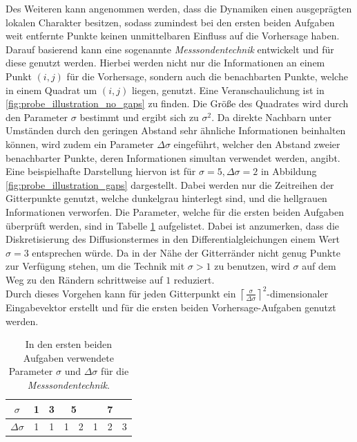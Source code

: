 Des Weiteren kann angenommen werden, dass die Dynamiken einen ausgeprägten lokalen Charakter besitzen, sodass zumindest bei den ersten beiden Aufgaben weit entfernte Punkte keinen unmittelbaren Einfluss auf die Vorhersage haben. Darauf basierend kann eine sogenannte \textit{Messsondentechnik} entwickelt und für diese genutzt werden. Hierbei werden nicht nur die Informationen an einem Punkt $(i, j)$ für die Vorhersage, sondern auch die benachbarten Punkte, welche in einem Quadrat um $(i, j)$ liegen, genutzt. Eine Veranschaulichung ist in \ref{fig:probe_illustration_no_gaps} zu finden. Die Größe des Quadrates wird durch den Parameter $\sigma$ bestimmt und ergibt sich zu $\sigma^2$. Da direkte Nachbarn unter Umständen durch den geringen Abstand sehr ähnliche Informationen beinhalten können, wird zudem ein Parameter $\Delta \sigma$ eingeführt, welcher den Abstand zweier benachbarter Punkte, deren Informationen simultan verwendet werden, angibt. Eine beispielhafte Darstellung hiervon ist für $\sigma = 5, \Delta \sigma=2$ in Abbildung \ref{fig:probe_illustration_gaps} dargestellt. Dabei werden nur die Zeitreihen der Gitterpunkte genutzt, welche dunkelgrau hinterlegt sind, und die hellgrauen Informationen verworfen. Die Parameter, welche für die ersten beiden Aufgaben überprüft werden, sind in Tabelle \ref{tab:probe_sigma_values} aufgelistet. Dabei ist anzumerken, dass die Diskretisierung des Diffusionstermes in den Differentialgleichungen einem Wert $\sigma=3$ entsprechen würde. Da in der Nähe der Gitterränder nicht genug Punkte zur Verfügung stehen, um die Technik mit $\sigma>1$ zu benutzen, wird $\sigma$ auf dem Weg zu den Rändern schrittweise auf $1$ reduziert.\\
Durch dieses Vorgehen kann für jeden Gitterpunkt ein ${\left \lceil{\frac{\sigma}{\Delta \sigma}}\right \rceil}^2$-dimensionaler Eingabevektor erstellt und für die ersten beiden Vorhersage-Aufgaben genutzt werden.\\

\begin{table}[h]
\centering
\begin{tabular}{cc|c|c|c|c|c|c}
\hline
$\sigma$ & 1 & 3 & \multicolumn{2}{c|}{5} & \multicolumn{3}{c}{7} \\
\hline
$\Delta \sigma$ & 1 & 1 & 1 & 2 & 1 & 2 & 3 \\
\hline
\end{tabular} 
\caption{In den ersten beiden Aufgaben verwendete Parameter $\sigma$ und $\Delta \sigma$ für die \textit{Messsondentechnik}.}
\label{tab:probe_sigma_values}
\end{table} 

